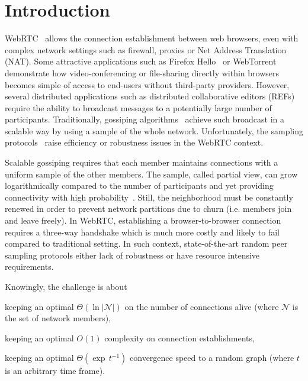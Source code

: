 
\section{Introduction}

WebRTC~\cite{webrtc} allows the connection establishment between web
browsers, even with complex network settings such as firewall, proxies or Net
Address Translation (NAT).  Some attractive applications such as Firefox
Hello~\cite{firefoxhello} or WebTorrent~\cite{webtorrent} demonstrate how
video-conferencing or file-sharing directly within browsers becomes simple of
access to end-users without third-party providers. However, several distributed
applications such as distributed collaborative editors (REFs) require the
ability to broadcast messages to a potentially large number of
participants. Traditionally, gossiping algorithms~\cite{eugster2003lightweight,
  tolgyeski2009adaptive} achieve such broadcast in a scalable way by using a
sample of the whole network. Unfortunately, the sampling
protocols~\cite{eugster2003lightweight, tolgyeski2009adaptive, ganesh2003peer,
  jelasity2004peer, voulgaris2005cyclon} raise efficiency or robustness
issues in the WebRTC context.

Scalable gossiping requires that each member maintains connections with a
uniform sample of the other members. The sample, called partial view, can grow
logarithmically compared to the number of participants and yet providing
connectivity with high probability~\cite{erdos1959random}. Still, the
neighborhood must be constantly renewed in order to prevent network partitions
due to churn (i.e. members join and leave freely). In WebRTC, establishing a
browser-to-browser connection requires a three-way handshake which is much more
costly and likely to fail compared to traditional setting. In such context,
state-of-the-art random peer sampling protocols either lack of robustness or
have resource intensive requirements.

Knowingly, the challenge is about
\begin{inparaenum}[(i)]
\item keeping an optimal $\Theta(\ln |\mathcal{N}|)$ on the number of
  connections alive\cite{erdos1959random} (where $\mathcal{N}$ is the set of
  network members),
\item keeping an optimal $O(1)$ complexity on connection establishments,
\item keeping an optimal $\Theta(\exp \, t^{-1})$ convergence speed to a random
  graph (where $t$ is an arbitrary time frame).
\end{inparaenum}

